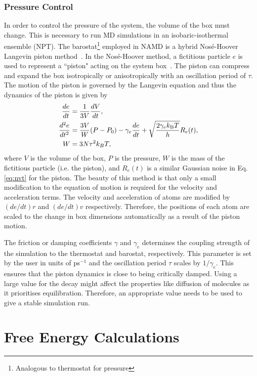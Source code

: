 \subsubsection{Pressure Control}
In order to control the pressure of the system, the volume of the box must change. This is 
necessary to run MD simulations in an isobaric-isothermal ensemble (NPT). The 
barostat\footnote{Analogous to thermostat for pressure} employed in NAMD is a hybrid 
Nos\'e-Hoover Langevin piston method~\cite{Feller1995}. In the Nos\'e-Hoover method, a fictitious 
particle $e$ is used to represent a ``piston" acting on the system box~\cite{Martyna1994}. 
The piston can compress and expand the box isotropically or anisotropically with an oscillation 
period of $\tau$. The motion of the piston is governed by the Langevin equation and thus the 
dynamics of the piston is given by 
\begin{subequations}
\begin{align}
\frac{d e}{dt} &= \frac{1}{3V}\frac{d V}{dt}, \\
\frac{d^2 e}{dt^2} &= \frac{3V}{W}(P-P_{0}) - \gamma_{e}\frac{d e}{dt} + \sqrt{\frac{2\gamma_{e}k_{\text{B}}T}{h}}R_{e}(t), \\
W &= 3N \tau^2 k_{B}T,
\end{align}
\end{subequations}
where $V$ is the volume of the box, $P$ is the pressure, $W$ is the mass of the fictitious 
particle (i.e. the piston), and $R_{e} (t)$ is a similar Gaussian noise in Eq.\eqref{eq:nvt} 
for the piston. The beauty of this method is that only a small modification to the equation of 
motion is required for the velocity and acceleration terms. The velocity and acceleration of 
atoms are modified by $(de/dt)r$ and $(de/dt)v$ respectively. Therefore, the positions of each 
atom are scaled to the change in box dimensions automatically as a result of the piston motion.

The friction or damping coefficients $\gamma$ and $\gamma_{e}$ determines the coupling strength 
of the simulation to the thermostat and barostat, respectively. This parameter is set by the user 
in units of ps$^{-1}$ and the oscillation period $\tau$ scales by $1/\gamma_{e}$. This ensures 
that the piston dynamics is close to being critically damped. Using a large value for the decay 
might affect the properties like diffusion of molecules as it prioritises equilibration. Therefore, 
an appropriate value needs to be used to give a stable simulation run.

\section{Free Energy Calculations}
\label{sec:freenergy}

